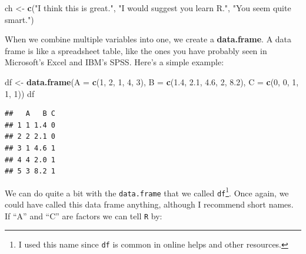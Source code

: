 \documentclass[]{tufte-book}
\newenvironment{Shaded}{}{}
\newcommand{\KeywordTok}[1]{\textcolor[rgb]{0.00,0.44,0.13}{\textbf{#1}}}
\newcommand{\DataTypeTok}[1]{\textcolor[rgb]{0.56,0.13,0.00}{#1}}
\newcommand{\DecValTok}[1]{\textcolor[rgb]{0.25,0.63,0.44}{#1}}
\newcommand{\FloatTok}[1]{\textcolor[rgb]{0.25,0.63,0.44}{#1}}
\newcommand{\StringTok}[1]{\textcolor[rgb]{0.25,0.44,0.63}{#1}}
\newcommand{\OperatorTok}[1]{\textcolor[rgb]{0.40,0.40,0.40}{#1}}
\newcommand{\NormalTok}[1]{#1}
\theoremstyle{definition}
\theoremstyle{definition}
\theoremstyle{remark}
\begin{document}
\begin{Shaded}
\begin{Highlighting}[]
\NormalTok{ch <-}\StringTok{ }\KeywordTok{c}\NormalTok{(}\StringTok{"I think this is great."}\NormalTok{, }\StringTok{"I would suggest you learn R."}\NormalTok{, }
    \StringTok{"You seem quite smart."}\NormalTok{)}
\end{Highlighting}
\end{Shaded}

When we combine multiple variables into one, we create a
\textbf{data.frame}. A data frame is like a spreadsheet table, like the
ones you have probably seen in Microsoft's Excel and IBM's SPSS. Here's
a simple example:

\begin{Shaded}
\begin{Highlighting}[]
\NormalTok{df <-}\StringTok{ }\KeywordTok{data.frame}\NormalTok{(}\DataTypeTok{A =} \KeywordTok{c}\NormalTok{(}\DecValTok{1}\NormalTok{, }\DecValTok{2}\NormalTok{, }\DecValTok{1}\NormalTok{, }\DecValTok{4}\NormalTok{, }\DecValTok{3}\NormalTok{), }\DataTypeTok{B =} \KeywordTok{c}\NormalTok{(}\FloatTok{1.4}\NormalTok{, }
    \FloatTok{2.1}\NormalTok{, }\FloatTok{4.6}\NormalTok{, }\DecValTok{2}\NormalTok{, }\FloatTok{8.2}\NormalTok{), }\DataTypeTok{C =} \KeywordTok{c}\NormalTok{(}\DecValTok{0}\NormalTok{, }\DecValTok{0}\NormalTok{, }\DecValTok{1}\NormalTok{, }\DecValTok{1}\NormalTok{, }\DecValTok{1}\NormalTok{))}
\NormalTok{df}
\end{Highlighting}
\end{Shaded}

\begin{verbatim}
##   A   B C
## 1 1 1.4 0
## 2 2 2.1 0
## 3 1 4.6 1
## 4 4 2.0 1
## 5 3 8.2 1
\end{verbatim}

We can do quite a bit with the \texttt{data.frame} that we called
\texttt{df}\footnote{I used this name since \texttt{df} is common in
  online helps and other resources.}. Once again, we could have called
this data frame anything, although I recommend short names. If ``A'' and
``C'' are factors we can tell \texttt{R} by:

\begin{Shaded}
\end{Shaded}
\end{document}
